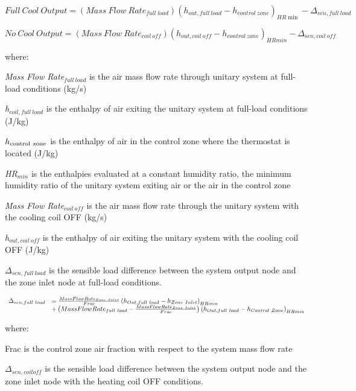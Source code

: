 \begin{equation}
Full~Cool~Output = (Mass~Flow~Rat{e_{full\;load}}){({h_{out,full~load}} - {h_{control~zone}})_{HR\min }} - {\Delta_{sen,full~load}}
\end{equation}

\begin{equation}
No~Cool~Output = (Mass~Flow~Rat{e_{coil~off}}){({h_{out,coil~off}} - {h_{control~zone}})_{HRmin }} - {\Delta_{sen,coil~off}}
\end{equation}

where:

\emph{Mass Flow Rate\(_{full~load}\)} is the air mass flow rate through unitary system at full-load conditions (kg/s)

\emph{h\(_{coil, full~load}\)} is the enthalpy of air exiting the unitary system at full-load conditions (J/kg)

\(h_{\rm{control~zone}}\) is the enthalpy of air in the control zone where the thermostat is located (J/kg)

\emph{HR\(_{min}\)} is the enthalpies evaluated at a constant humidity ratio, the minimum humidity ratio of the unitary system exiting air or the air in the control zone

\emph{Mass Flow Rate\(_{coil~off}\)} is the air mass flow rate through the unitary system with the cooling coil OFF (kg/s)

\emph{h\(_{out,coil~off}\)} is the enthalpy of air exiting the unitary system with the cooling coil OFF (J/kg)

\(\Delta_{sen,full~load}\) is the sensible load difference between the system output node and the zone inlet node at full-load conditions.

\begin{equation}
  \begin{array}{rl}
    \Delta_{sen,full~load} &= \frac{MassFlowRate_{Zone~Inlet}}{Frac} \left(h_{Out,full~load} - h_{Zone~Inlet}\right)_{HRmin} \\
                           &+ \left(MassFlowRate_{full~load} - \frac{MassFlowRate_{Zone~Inlet}}{Frac}\right) \left( h_{Out,full~load} - h_{Control~Zone}\right)_{HRmin}
  \end{array}
\end{equation}

where:

Frac is the control zone air fraction with respect to the system mass flow rate

\(\Delta_{sen,coil off}\) is the sensible load difference between the system output node and the zone inlet node with the heating coil OFF conditions.

